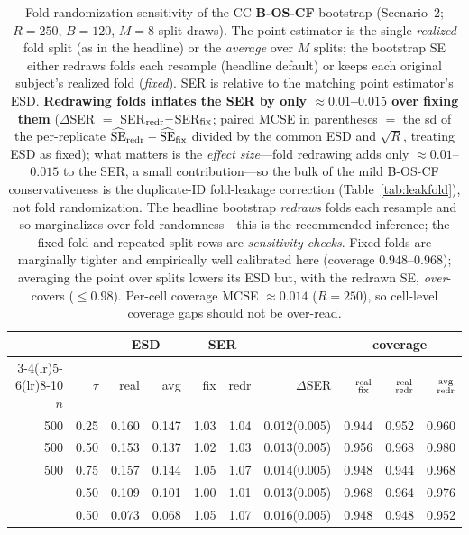 \begin{table}[t]\centering\small
\caption{Fold-randomization sensitivity of the CC \textbf{B-OS-CF} bootstrap (Scenario~2; $R=250$, $B=120$, $M=8$ split draws). The point estimator is the single \emph{realized} fold split (as in the headline) or the \emph{average} over $M$ splits; the bootstrap SE either redraws folds each resample (headline default) or keeps each original subject's realized fold (\emph{fixed}). SER is relative to the matching point estimator's ESD. \textbf{Redrawing folds inflates the SER by only $\approx0.01$--$0.015$ over fixing them} ($\Delta$SER $=$ SER$_{\rm redr}-$SER$_{\rm fix}$; paired MCSE in parentheses $=$ the sd of the per-replicate $\widehat{\mathrm{SE}}_{\rm redr}-\widehat{\mathrm{SE}}_{\rm fix}$ divided by the common ESD and $\sqrt R$, treating ESD as fixed); what matters is the \emph{effect size}---fold redrawing adds only $\approx0.01$--$0.015$ to the SER, a small contribution---so the bulk of the mild B-OS-CF conservativeness is the duplicate-ID fold-leakage correction (Table~\ref{tab:leakfold}), not fold randomization. The headline bootstrap \emph{redraws} folds each resample and so marginalizes over fold randomness---this is the recommended inference; the fixed-fold and repeated-split rows are \emph{sensitivity checks}. Fixed folds are marginally tighter and empirically well calibrated here (coverage $0.948$--$0.968$); averaging the point over splits lowers its ESD but, with the redrawn SE, \emph{over}-covers ($\le0.98$). Per-cell coverage MCSE $\approx0.014$ ($R{=}250$), so cell-level coverage gaps should not be over-read.}
\label{tab:foldsens}\begin{tabular}{rr rr rr r rrr}\toprule
&&\multicolumn{2}{c}{ESD}&\multicolumn{2}{c}{SER}&&\multicolumn{3}{c}{coverage}\\
\cmidrule(lr){3-4}\cmidrule(lr){5-6}\cmidrule(lr){8-10}
$n$&$\tau$&real&avg&fix&redr&$\Delta$SER&$\substack{\rm real\\ \rm fix}$&$\substack{\rm real\\ \rm redr}$&$\substack{\rm avg\\ \rm redr}$\\\midrule
500 & 0.25 & 0.160 & 0.147 & 1.03 & 1.04 & 0.012(0.005) & 0.944 & 0.952 & 0.960 \\
500 & 0.50 & 0.153 & 0.137 & 1.02 & 1.03 & 0.013(0.005) & 0.956 & 0.968 & 0.980 \\
500 & 0.75 & 0.157 & 0.144 & 1.05 & 1.07 & 0.014(0.005) & 0.948 & 0.944 & 0.968 \\
\addlinespace
1000 & 0.50 & 0.109 & 0.101 & 1.00 & 1.01 & 0.013(0.005) & 0.968 & 0.964 & 0.976 \\
\addlinespace
2000 & 0.50 & 0.073 & 0.068 & 1.05 & 1.07 & 0.016(0.005) & 0.948 & 0.948 & 0.952 \\
\bottomrule\end{tabular}\end{table}
